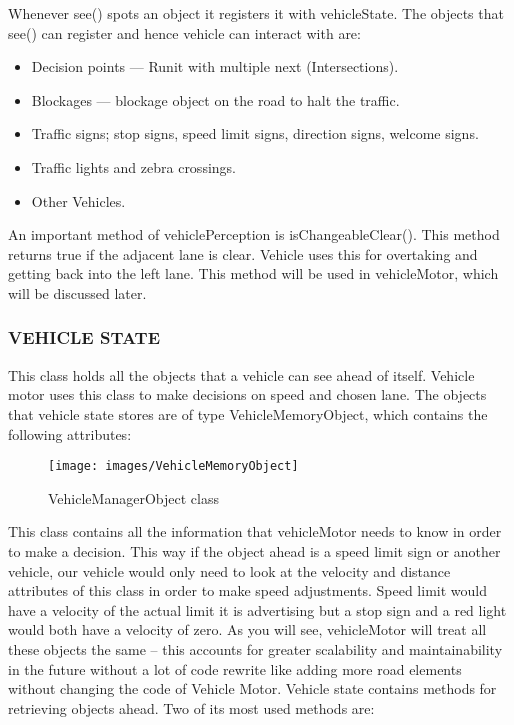 \documentclass[11pt,a4paper]{article}
\begin{document}
Whenever see() spots an object it registers it with vehicleState. The objects that see() can register and hence vehicle can interact with are:
	
	\begin{itemize}
		\item Decision points --- Runit with multiple next (Intersections).
		\item Blockages --- blockage object on the road to halt the traffic.
		\item Traffic signs; stop signs, speed limit signs, direction signs, welcome signs.
		\item Traffic lights and zebra crossings.
		\item Other Vehicles.
	\end{itemize}
	
	An important method of vehiclePerception is isChangeableClear(). This method returns true if the adjacent lane is clear. Vehicle uses this for overtaking and getting back into the left lane. This method will be used in vehicleMotor, which will be discussed later.
  
  \subsubsection{VEHICLE STATE}
  
  This class holds all the objects that a vehicle can see ahead of itself. Vehicle motor uses this class to make decisions on speed and chosen lane.
The objects that vehicle state stores are of type VehicleMemoryObject, which contains the following attributes:

  		\begin{figure}[h!]
			\texttt{[image: images/VehicleMemoryObject]}
			\caption{VehicleManagerObject class}
			\centering
		\end{figure} 
		
		This class contains all the information that vehicleMotor needs to know in order to make a decision. This way if the object ahead is a speed limit sign or another vehicle, our vehicle would only need to look at the velocity and distance attributes of this class in order to make speed adjustments. Speed limit would have a velocity of the actual limit it is advertising but a stop sign and a red light would both have a velocity of zero. As you will see, vehicleMotor will treat all these objects the same – this accounts for greater scalability and maintainability in the future without a lot of code rewrite like adding more road elements without changing the code of Vehicle Motor.
			Vehicle state contains methods for retrieving objects ahead. Two of its most used methods are:
		
\end{document}
